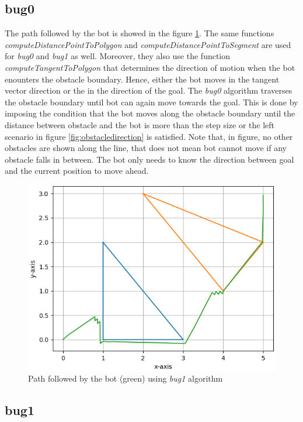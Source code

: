 \documentclass[a4paper, 11pt, letterpaper]{article}
\begin{document}
\subsection{bug0}
The path followed by the bot is showed in the figure \ref{fig:bug0}.
The same functions \textit{computeDistancePointToPolygon} and \textit{computeDistancePointToSegment} are used for \textit{bug0} and \textit{bug1} as well. Moreover, they also use the function \textit{computeTangentToPolygon} that determines the direction of motion when the bot enounters the obstacle boundary. Hence, either the bot moves in the tangent vector direction or the in the direction of the goal. The \textit{bug0} algorithm traverses the obstacle boundary until bot can again move towards the goal. This is done by imposing the condition that the bot moves along the obstacle boundary until the distance between obstacle and the bot is more than the step size or the left scenario in figure \ref{fig:obstacledirection} is satisfied. Note that, in figure, no other obstacles are shown along the line, that does not mean bot cannot move if any obstacle falls in between. The bot only needs to know the direction between goal and the current position to move ahead.

\begin{figure}[tbhp!]
	\centering
	\includegraphics[scale = 0.5]{plots/bug0Path.png}
	\caption{\footnotesize{Path followed by the bot (green) using \textit{bug1} algorithm}}
	\label{fig:bug0}
\end{figure}


\subsection{bug1}
\end{document}
